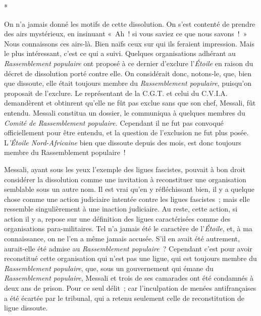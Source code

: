 \documentclass[french,twoside]{book} %
\begin{document}
\begin{center}
*\end{center}
\noindent \par
On n'a jamais donné les motifs de cette dissolution. On s'est contenté de prendre des airs mystérieux, en insinuant « Ah ! si vous saviez ce que nous savons ! » Nous connaissons ces airs-là. Bien naïfs ceux sur qui ils feraient impression. Mais le plus intéressant, c'est ce qui a suivi. Quelques organi­sations adhérant au {\itshape Rassemblement populaire} ont proposé à ce dernier d'exclure l'{\itshape Étoile} en raison du décret de dissolution porté contre elle. On considérait donc, notons-le, que, bien que dissoute, elle était toujours membre du {\itshape Rassemblement populaire}, puisqu'on proposait de l'exclure. Le représentant de la C.G.T. et celui du C.V.I.A. demandèrent et obtinrent qu'elle ne fût pas exclue sans que son chef, Messali, fût entendu. Messali constitua un dossier, le communiqua à quelques membres du {\itshape Comité de Rassemblement populaire.} Cependant il ne fut pas convoqué officiellement pour être entendu, et la ques­tion de l'exclusion ne fut plus posée. L{\itshape 'Étoile Nord-Africaine} bien que dissoute depuis des mois, est donc toujours membre du Rassemblement populaire !\par
Messali, ayant sous les yeux l'exemple des ligues fascistes, pouvait à bon droit considérer la dissolution comme une invitation à reconstituer une organisation semblable sous un autre nom. Il est vrai qu'en y réfléchissant bien, il y a quelque chose comme une action judiciaire intentée contre les ligues fascistes ; mais elle ressemble singulièrement à une inaction judiciaire. Au reste, cette action, si action il y a, repose sur une définition des ligues caractérisées comme des organisations para-militaires. Tel n'a jamais été le caractère de l'{\itshape Étoile}, et, à ma connaissance, on ne l'en a même jamais accusée. S'il en avait été autrement, aurait-elle été admise au {\itshape Rassemblement popu­laire} ? Cependant c'est pour avoir reconstitué cette organisation qui n'est pas une ligue, qui est toujours membre du {\itshape Rassemblement populaire}, que, sous un gouvernement qui émane du {\itshape Rassemblement populaire}, Messali et trois de ses camarades ont été condamnés à deux ans de prison. Pour ce seul délit ; car l'inculpation de menées antifrançaises a été écartée par le tribunal, qui a retenu seulement celle de reconstitution de ligue dissoute.\par
\par
\end{document}
